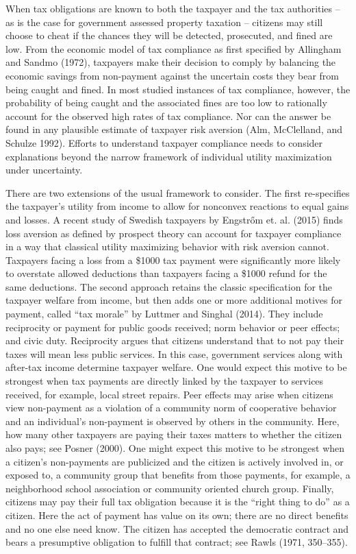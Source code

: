 \documentclass[12pt,titlepage]{article}
\begin{document}
When tax obligations are known to both the taxpayer and the tax
authorities – as is the case for government assessed property
taxation – citizens may still choose to cheat if the chances they
will be detected, prosecuted, and fined are low.  From the economic
model of tax compliance as first specified by Allingham and Sandmo (1972),
taxpayers make their decision to comply by balancing the economic
savings from non-payment against the uncertain costs they bear from
being caught and fined.  In most studied instances of tax compliance,
however, the probability of being caught and the associated fines are
too low to rationally account for the observed high rates of tax
compliance.    Nor can the answer be found in any plausible estimate
of taxpayer risk aversion (Alm, McClelland, and Schulze 1992). 
Efforts to understand taxpayer compliance needs to consider explanations
beyond the narrow framework of individual utility maximization under uncertainty.  

There are two extensions of the usual framework to consider. 
The first re-specifies the taxpayer’s utility from income to allow for
nonconvex reactions to equal gains and losses.  A recent study of 
Swedish taxpayers by Engstr{\H o}m et. al. (2015) finds loss aversion 
as defined by prospect theory can account for taxpayer compliance in 
a way that classical utility maximizing behavior with risk aversion 
cannot.  Taxpayers facing a loss from a \$1000 tax payment were
significantly more likely to overstate allowed deductions than
taxpayers facing a \$1000 refund for the same deductions.  
The second approach retains the classic specification for the 
taxpayer welfare from income, but then adds one or more additional 
motives for payment, called “tax morale” by Luttmer and Singhal (2014).  
They include reciprocity or payment for public goods received; 
norm behavior or peer effects; and civic duty.   Reciprocity argues 
that citizens understand that to not pay their taxes will mean less 
public services.   In this case, government services along with 
after-tax income determine taxpayer welfare.  One would expect this 
motive to be strongest when tax payments are directly linked by the 
taxpayer to services received, for example, local street repairs.   
Peer effects may arise when citizens view non-payment as a violation 
of a community norm of cooperative behavior and an individual’s 
non-payment is observed by others in the community.  Here, how many 
other taxpayers are paying their taxes matters to whether the citizen 
also pays; see Posner (2000).   One might expect this motive to be 
strongest when a citizen’s non-payments are publicized and the citizen 
is actively involved in, or exposed to,  a community group that benefits 
from those payments, for example, a neighborhood school association or 
community oriented church group.  Finally, citizens may pay their full 
tax obligation because it is the “right thing to do” as a citizen.  
Here the act of payment has value on its own; there are no direct 
benefits and no one else need know.  The citizen has accepted the 
democratic contract and bears a presumptive obligation to fulfill 
that contract; see Rawls (1971, 350–355).  
\end{document}
